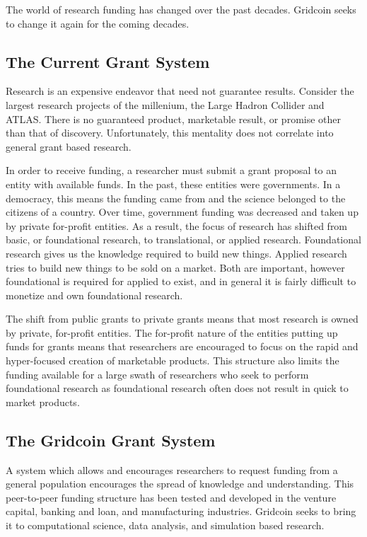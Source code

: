 The world of research funding has changed over the past decades.  Gridcoin seeks to change it again for the coming decades.

\subsection{The Current Grant System}

Research is an expensive endeavor that need not guarantee results.  Consider the largest research projects of the millenium, the Large Hadron Collider and ATLAS.  There is no guaranteed product, marketable result, or promise other than that of discovery.  Unfortunately, this mentality does not correlate into general grant based research.  

In order to receive funding, a researcher must submit a grant proposal to an entity with available funds.  In the past, these entities were governments.  In a democracy, this means the funding came from and the science belonged to the citizens of a country.  Over time, government funding was decreased and taken up by private for-profit entities.  As a result, the focus of research has shifted from basic, or foundational research, to translational, or applied research.  Foundational research gives us the knowledge required to build new things.  Applied research tries to build new things to be sold on a market.  Both are important, however foundational is required for applied to exist, and in general it is fairly difficult to monetize and own foundational research.

The shift from public grants to private grants means that most research is owned by private, for-profit entities.  The for-profit nature of the entities putting up funds for grants means that researchers are encouraged to focus on the rapid and hyper-focused creation of marketable products.  This structure also limits the funding available for a large swath of researchers who seek to perform foundational research as foundational research often does not result in quick to market products.

\subsection{The Gridcoin Grant System}

A system which allows and encourages researchers to request funding from a general population encourages the spread of knowledge and understanding.  This peer-to-peer funding structure has been tested and developed in the venture capital, banking and loan, and manufacturing industries.  Gridcoin seeks to bring it to computational science, data analysis, and simulation based research.

